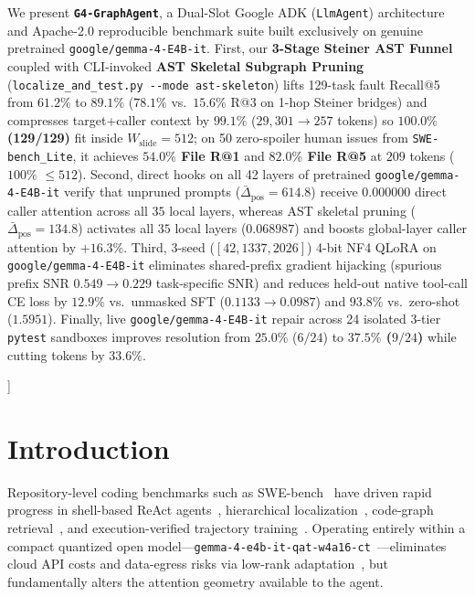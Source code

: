 \documentclass[10pt,twocolumn,letterpaper]{article}
\begin{document}
{\begin{@twocolumnfalse}
\begin{center}
{\begin{minipage}{0.97\textwidth}
We present \textbf{\texttt{G4-GraphAgent}}, a Dual-Slot Google ADK (\texttt{LlmAgent}) architecture and Apache-2.0 reproducible benchmark suite built exclusively on genuine pretrained \texttt{google/gemma-4-E4B-it}. First, our \textbf{3-Stage Steiner AST Funnel} coupled with CLI-invoked \textbf{AST Skeletal Subgraph Pruning} (\texttt{localize\_and\_test.py -\/-mode ast-skeleton}) lifts 129-task fault Recall@5 from $61.2\%$ to \textbf{$89.1\%$} ($78.1\%$ vs.\ $15.6\%$ R@3 on 1-hop Steiner bridges) and compresses target+caller context by \textbf{$99.1\%$} ($29,301 \to 257$ tokens) so \textbf{$100.0\%$ (129/129)} fit inside $W_{\text{slide}}{=}512$; on 50 zero-spoiler human issues from \texttt{SWE-bench\_Lite}, it achieves \textbf{$54.0\%$ File R@1} and \textbf{$82.0\%$ File R@5} at $209$ tokens ($100\%$ $\le 512$). Second, direct hooks on all 42 layers of pretrained \texttt{google/gemma-4-E4B-it} verify that unpruned prompts ($\bar{\Delta}_{\text{pos}}{=}614.8$) receive \textbf{$0.000000$} direct caller attention across all $35$ local layers, whereas AST skeletal pruning ($\bar{\Delta}_{\text{pos}}{=}134.8$) activates all $35$ local layers (\textbf{$0.068987$}) and boosts global-layer caller attention by $+16.3\%$. Third, 3-seed ($[42,1337,2026]$) 4-bit NF4 QLoRA on \texttt{google/gemma-4-E4B-it} eliminates shared-prefix gradient hijacking (spurious prefix SNR $0.549 \to 0.229$ task-specific SNR) and reduces held-out native tool-call CE loss by \textbf{$12.9\%$} vs.\ unmasked SFT ($0.1133 \to 0.0987$) and \textbf{$93.8\%$} vs.\ zero-shot ($1.5951$). Finally, live \texttt{google/gemma-4-E4B-it} repair across 24 isolated 3-tier \texttt{pytest} sandboxes improves resolution from $25.0\%$ ($6/24$) to \textbf{$37.5\%$ ($9/24$)} while cutting tokens by $33.6\%$.
\vspace{1.8pt}
\end{minipage}}
\end{center}
\vspace{1.5pt}
\end{@twocolumnfalse}
}]

\section{Introduction}
Repository-level coding benchmarks such as SWE-bench~\cite{jimenez2024swebench} have driven rapid progress in shell-based ReAct agents~\cite{yang2024sweagent,wang2024openhands}, hierarchical localization~\cite{xia2024agentless,zhang2024autocoderover}, code-graph retrieval~\cite{ouyang2025repograph,chen2025locagent,yu2025orcaloca}, and execution-verified trajectory training~\cite{pan2025swegym}. Operating entirely within a compact quantized open model—\texttt{gemma-4-e4b-it-qat-w4a16-ct}~\cite{gemma4report,gemma4comp}—eliminates cloud API costs and data-egress risks via low-rank adaptation~\cite{hu2022lora,dettmers2023qlora}, but fundamentally alters the attention geometry available to the agent.
\end{document}
